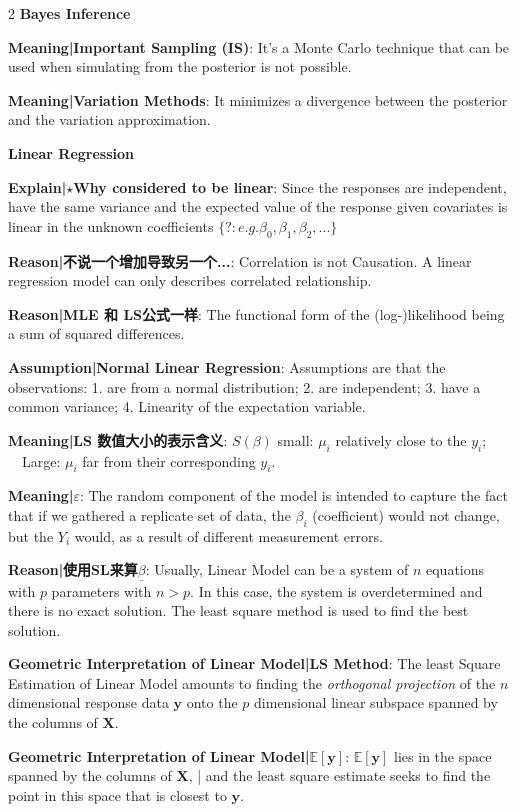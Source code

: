 \documentclass[9pt]{article}
\begin{document}
\begin{multicols}{2}
\vspace{5pt}
\textbf{Bayes Inference}

\textbf{Meaning|Important Sampling (IS)}: It's a Monte Carlo technique that can be used when simulating from the posterior is not possible.

\textbf{Meaning|Variation Methods}: It minimizes a divergence between the posterior and the variation approximation.

\vspace{5pt}
\textbf{Linear Regression}

\textbf{Explain|$\star$Why considered to be linear}: Since the responses are independent, have the same variance and the expected value of the response given covariates is linear in the unknown coefficients $\{?:e.g.\beta_0,\beta_1,\beta_2,...\}$

\textbf{Reason|不说一个增加导致另一个...}: Correlation is not Causation. A linear regression model can only describes correlated relationship.

\textbf{Reason|MLE 和 LS公式一样}: The functional form of the (log-)likelihood being a sum of squared differences.

\textbf{Assumption|Normal Linear Regression}: Assumptions are that the observations: 1. are from a normal distribution; 2. are independent; 3. have a common variance; 4. Linearity of the expectation variable.

\textbf{Meaning|LS 数值大小的表示含义}: $S(\beta)$ small: $\mu_i$ relatively close to the $y_i$; \ \ Large: $\mu_i$ far from their corresponding $y_i$.

\textbf{Meaning|$\varepsilon$}: The random component of the model is intended to capture the fact that if we gathered a replicate set of data, the $\beta_i$ (coefficient) would not change, but the $Y_i$ would, as a result of different measurement errors.

\textbf{Reason|使用SL来算$\underline{\beta}$}: Usually, Linear Model can be a system of $n$ equations with $p$ parameters with $n>p$. In this case, the system is overdetermined and there is no exact solution. The least square method is used to find the best solution.

\textbf{Geometric Interpretation of Linear Model|LS Method}: The least Square Estimation of Linear Model amounts to finding the \textit{orthogonal projection} of the $n$ dimensional response data $\mathbf{y}$ onto the $p$ dimensional linear subspace spanned by the columns of $\mathbf{X}$.

\textbf{Geometric Interpretation of Linear Model|$\mathbb{E}[\mathbf{y}]$}: $\mathbb{E}[\mathbf{y}]$ lies in the space spanned by the columns of $\mathbf{X}$, | and the least square estimate seeks to find the point in this space that is closest to $\mathbf{y}$.


\end{multicols}
\end{document}

